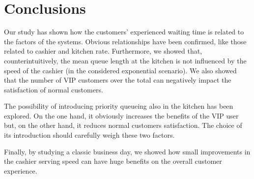 \section{Conclusions}
Our study has shown how the customers' experienced waiting time is related to the factors of the systems. Obvious relationships have been confirmed, like those related to cashier and kitchen rate. 
Furthermore, we showed that, counterintuitively, the mean queue length at the kitchen is not influenced by the speed of the cashier (in the considered exponential scenario). 
We also showed that the number of VIP customers over the total can negatively impact the satisfaction of normal customers.

The possibility of introducing priority queueing also in the kitchen has been explored. On the one hand, it obviously increases the benefits of the VIP user but, on the other hand, it reduces normal customers satisfaction. The choice of its introduction should carefully weigh these two factors.

Finally, by studying a classic business day, we showed how small improvements in the cashier serving speed can have huge benefits on the overall customer experience.
